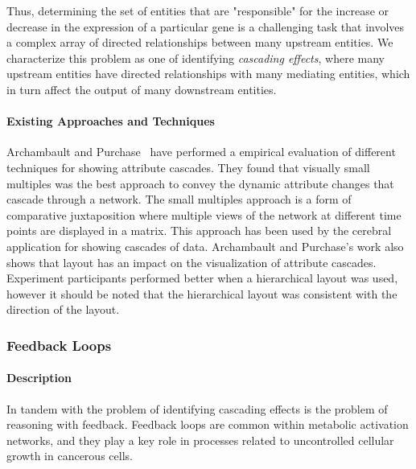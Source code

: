 Thus, determining the set of entities that are "responsible" for the increase or decrease in the expression of a particular gene is a challenging task that involves a complex array of directed relationships between many upstream entities.
We characterize this problem as one of identifying \textit{cascading effects}, where many upstream entities have directed relationships with many mediating entities, which in turn affect the output of many downstream entities.

\paragraph*{Existing Approaches and Techniques}

Archambault and Purchase~\cite{Archambault2016} have performed a empirical evaluation of different techniques for showing attribute cascades.
They found that visually small multiples was the best approach to convey the dynamic attribute changes that cascade through a network.
The small multiples approach is a form of comparative juxtaposition where multiple views of the network at different time points are displayed in a matrix.
This approach has been used by the cerebral application for showing cascades of data.
Archambault and Purchase's work also shows that layout has an impact on the visualization of attribute cascades.
Experiment participants performed better when a hierarchical layout was used, however it should be noted that the hierarchical layout was consistent with the direction of the layout.


\subsubsection*{Feedback Loops}

\paragraph*{Description}

In tandem with the problem of identifying cascading effects is the problem of reasoning with feedback.
Feedback loops are common within metabolic activation networks, and they play a key role in processes related to uncontrolled cellular growth in cancerous cells.

